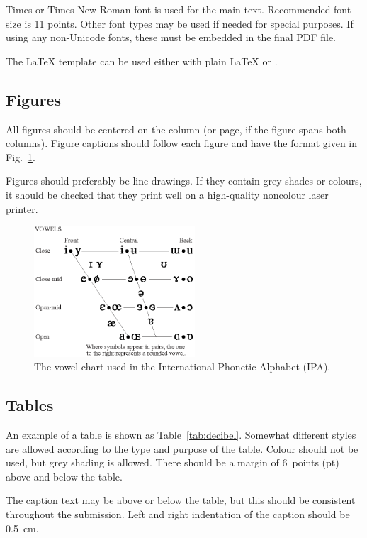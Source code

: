 \documentclass[a4paper,11pt,twocolumn]{article}
\begin{document}
Times or Times New Roman font is used for the main text. Recommended font size is 11 points. Other font types may be used if needed for special purposes. If using any non-Unicode fonts, these must be embedded in the final PDF file.

The \LaTeX{} template can be used either with plain \LaTeX{} or \XeLaTeX.

\subsection{Figures}

All figures should be centered on the column (or page, if the figure
spans both columns). Figure captions should follow each figure and
have the format given in Fig.~\ref{fig:vowels}.

Figures should preferably be line drawings. If they contain grey
shades or colours, it should be checked that they print well on a
high-quality noncolour laser printer.

\begin{figure}[!ht]
\begin{center}
\includegraphics[width=6cm]{ipa.eps}
\caption{The vowel chart used in the International Phonetic
Alphabet (IPA).}\label{fig:vowels}
\end{center}
\end{figure}

\subsection{Tables}

An example of a table is shown as Table~\ref{tab:decibel}.  Somewhat
different styles are allowed according to the type and purpose of the
table. Colour should not be used, but grey shading is allowed. There
should be a margin of 6~points (pt) above and below the table.

The caption text may be above or below the table, but this should be
consistent throughout the submission. Left and right indentation of
the caption should be 0.5~cm.
\end{document}
